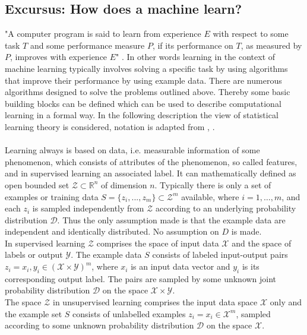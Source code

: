 \begin{tcolorbox}
    \subsection*{Excursus: How does a machine learn?}
    "A computer program is said to learn from experience $E$ with respect to some task $T$ and some performance measure $P$, if its performance on $T$, as measured by $P$, improves with experience $E$" \cite{Mitchell1997}. In other words learning in the context of machine learning typically involves solving a specific task by using algorithms that improve their performance by using example data. There are numerous algorithms designed to solve the problems outlined above. Thereby some basic building blocks can be defined which can be used to describe computational learning in a formal way. In the following description the view of statistical learning theory is considered, notation is adapted from \citeauthor{Shalev2014}\cite{Shalev2014}, \citeauthor{Von_luxburg2011}\cite{Von_luxburg2011}.\\
    \\
    Learning always is based on data, i.e. measurable information of some phenomenon, which consists of attributes of the phenomenon, so called features, and in supervised learning an associated label. It can mathematically defined as open bounded set $\mathcal{Z}\subset\mathbb{R}^n$ of dimension $n$. Typically there is only a set of examples or training data $S=\{z_i,...,z_m\}\subset{\mathcal{Z}}^m$ available, where $i = 1,\dots,m$, and each $z_i$ is sampled independently from $\mathcal{Z}$ according to an underlying probability distribution $\mathcal{D}$. Thus the only assumption made is that the example data are independent and identically distributed. No assumption on $D$ is made.\\
    In supervised learning $\mathcal{Z}$ comprises the space of input data $\mathcal{X}$ and the space of labels or output $\mathcal{Y}$. The example data $S$ consists of labeled input-output pairs $z_i=x_i,y_i\in(\mathcal{X}\times\mathcal{Y})^m$, where $x_i$ is an input data vector and $y_i$ is its corresponding output label. The pairs are sampled by some unknown joint probability distribution $\mathcal{D}$ on the space $\mathcal{X}\times\mathcal{Y}$.\\
    The space $\mathcal{Z}$ in unsupervised learning comprises the input data space $\mathcal{X}$ only and the example set $S$ consists of unlabelled examples $z_i=x_i\in\mathcal{X}^m$, sampled according to some unknown probability distribution $\mathcal{D}$ on the space $\mathcal{X}$.\\

\end{tcolorbox}
